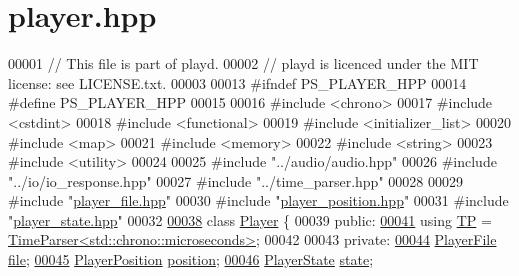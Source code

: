 \hypertarget{player_8hpp_source}{\section{player.\+hpp}
\label{player_8hpp_source}
}

\begin{DoxyCode}
00001 \textcolor{comment}{// This file is part of playd.}
00002 \textcolor{comment}{// playd is licenced under the MIT license: see LICENSE.txt.}
00003 
00013 \textcolor{preprocessor}{#ifndef PS\_PLAYER\_HPP}
00014 \textcolor{preprocessor}{#define PS\_PLAYER\_HPP}
00015 
00016 \textcolor{preprocessor}{#include <chrono>}
00017 \textcolor{preprocessor}{#include <cstdint>}
00018 \textcolor{preprocessor}{#include <functional>}
00019 \textcolor{preprocessor}{#include <initializer\_list>}
00020 \textcolor{preprocessor}{#include <map>}
00021 \textcolor{preprocessor}{#include <memory>}
00022 \textcolor{preprocessor}{#include <string>}
00023 \textcolor{preprocessor}{#include <utility>}
00024 
00025 \textcolor{preprocessor}{#include "../audio/audio.hpp"}
00026 \textcolor{preprocessor}{#include "../io/io\_response.hpp"}
00027 \textcolor{preprocessor}{#include "../time\_parser.hpp"}
00028 
00029 \textcolor{preprocessor}{#include "\hyperlink{player__file_8hpp}{player\_file.hpp}"}
00030 \textcolor{preprocessor}{#include "\hyperlink{player__position_8hpp}{player\_position.hpp}"}
00031 \textcolor{preprocessor}{#include "\hyperlink{player__state_8hpp}{player\_state.hpp}"}
00032 
\hypertarget{player_8hpp_source_l00038}{}\hyperlink{classPlayer}{00038} \textcolor{keyword}{class }\hyperlink{classPlayer}{Player} \{
00039 \textcolor{keyword}{public}:
\hypertarget{player_8hpp_source_l00041}{}\hyperlink{classPlayer_ab2c65f4a7cbaf6aab6fafbb5633a42c4}{00041}     \textcolor{keyword}{using} \hyperlink{classTimeParser}{TP} = \hyperlink{classTimeParser}{TimeParser<std::chrono::microseconds>};
00042 
00043 \textcolor{keyword}{private}:
\hypertarget{player_8hpp_source_l00044}{}\hyperlink{classPlayer_abcb788a7830c40ae5ba2a219c5341a58}{00044}     \hyperlink{classPlayerFile}{PlayerFile} \hyperlink{classPlayer_abcb788a7830c40ae5ba2a219c5341a58}{file};         
\hypertarget{player_8hpp_source_l00045}{}\hyperlink{classPlayer_a7b0a4ce9f2ebf3d1e026cf3e0ee61152}{00045}     \hyperlink{classPlayerPosition}{PlayerPosition} \hyperlink{classPlayer_a7b0a4ce9f2ebf3d1e026cf3e0ee61152}{position}; 
\hypertarget{player_8hpp_source_l00046}{}\hyperlink{classPlayer_afb60fdad921bce05783ef2709e849c27}{00046}     \hyperlink{classPlayerState}{PlayerState} \hyperlink{classPlayer_afb60fdad921bce05783ef2709e849c27}{state};       

\end{DoxyCode}
